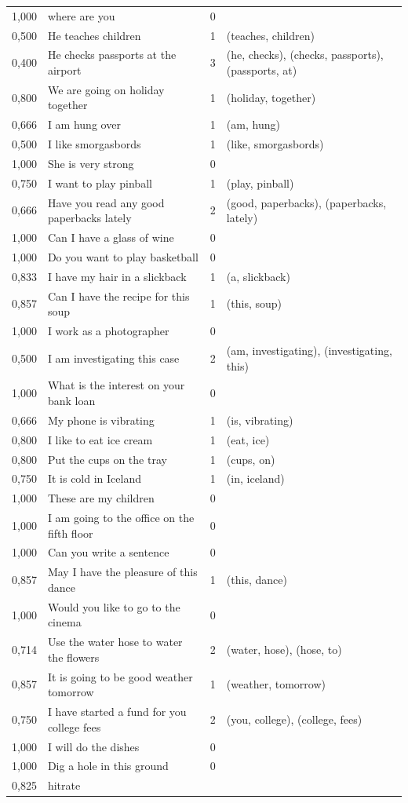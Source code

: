 \documentclass[a4paper,12pt]{article}
\begin{document}
\begin{landscape}
\begin{longtable}{l l r l}
1,000 & where are you & 0 &  \\
0,500 & He teaches children & 1 & (teaches, children) \\
0,400 & He checks passports at the airport & 3 & (he, checks), (checks, passports), (passports, at) \\
0,800 & We are going on holiday together & 1 & (holiday, together) \\
0,666 & I am hung over & 1 & (am, hung) \\
0,500 & I like smorgasbords & 1 & (like, smorgasbords) \\
1,000 & She is very strong & 0 &  \\
0,750 & I want to play pinball & 1 & (play, pinball) \\
0,666 & Have you read any good paperbacks lately & 2 & (good, paperbacks), (paperbacks, lately) \\
1,000 & Can I have a glass of wine & 0 &  \\
1,000 & Do you want to play basketball & 0 &  \\
0,833 & I have my hair in a slickback & 1 & (a, slickback) \\
0,857 & Can I have the recipe for this soup & 1 & (this, soup) \\
1,000 & I work as a photographer & 0 &  \\
0,500 & I am investigating this case & 2 & (am, investigating), (investigating, this) \\
1,000 & What is the interest on your bank loan & 0 &  \\
0,666 & My phone is vibrating & 1 & (is, vibrating) \\
0,800 & I like to eat ice cream & 1 & (eat, ice) \\
0,800 & Put the cups on the tray & 1 & (cups, on) \\
0,750 & It is cold in Iceland & 1 & (in, iceland) \\
1,000 & These are my children & 0 &  \\
1,000 & I am going to the office on the fifth floor & 0 &  \\
1,000 & Can you write a sentence & 0 &  \\
0,857 & May I have the pleasure of this dance & 1 & (this, dance) \\
1,000 & Would you like to go to the cinema & 0 &  \\
0,714 & Use the water hose to water the flowers & 2 & (water, hose), (hose, to) \\
0,857 & It is going to be good weather tomorrow & 1 & (weather, tomorrow) \\
0,750 & I have started a fund for you college fees & 2 & (you, college), (college, fees) \\
1,000 & I will do the dishes & 0 &  \\
1,000 & Dig a hole in this ground & 0 &  \\
\hline
0,825 & hitrate
\label{tab:resultcorrect}
\end{longtable}
\end{landscape}
\end{document}
